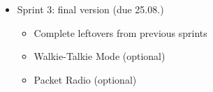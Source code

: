 \begin{itemize}
	\item Sprint 3: final version (due 25.08.)
	\begin{itemize}
		\item Complete leftovers from previous sprints
		\item Walkie-Talkie Mode (optional)
		\item Packet Radio (optional)
	\end{itemize}
\end{itemize}



%

